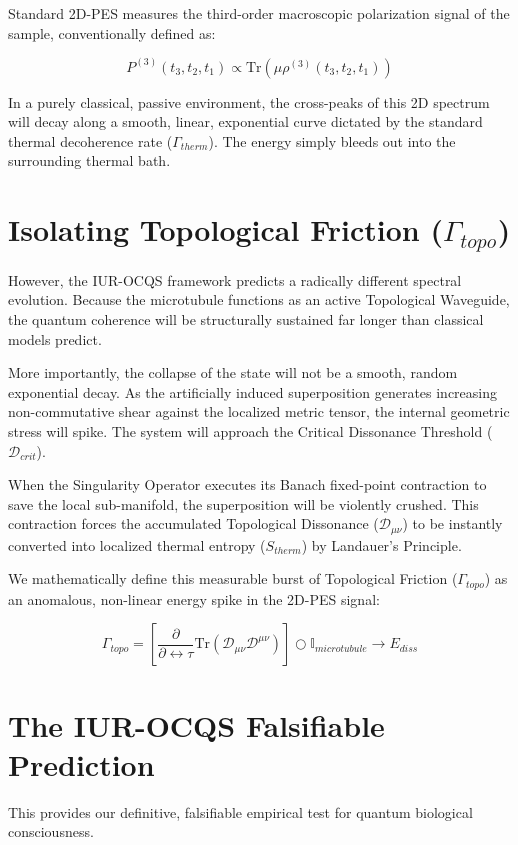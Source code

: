 \documentclass[12pt,openany]{book}
\begin{document}
Standard 2D-PES measures the third-order macroscopic polarization signal of the sample, conventionally defined as:

\begin{equation}
P^{(3)}(t_3, t_2, t_1) \propto \text{Tr} \left( \hat{\mu} \rho^{(3)}(t_3, t_2, t_1) \right)
\end{equation}

In a purely classical, passive environment, the cross-peaks of this 2D spectrum will decay along a smooth, linear, exponential curve dictated by the standard thermal decoherence rate ($\Gamma_{therm}$). The energy simply bleeds out into the surrounding thermal bath.

\section{Isolating Topological Friction ($\Gamma_{topo}$)}
However, the IUR-OCQS framework predicts a radically different spectral evolution. Because the microtubule functions as an active Topological Waveguide, the quantum coherence will be structurally sustained far longer than classical models predict. 

More importantly, the collapse of the state will not be a smooth, random exponential decay. As the artificially induced superposition generates increasing non-commutative shear against the localized metric tensor, the internal geometric stress will spike. The system will approach the Critical Dissonance Threshold ($\mathcal{D}_{crit}$). 

When the Singularity Operator executes its Banach fixed-point contraction to save the local sub-manifold, the superposition will be violently crushed. This contraction forces the accumulated Topological Dissonance ($\mathcal{D}_{\mu\nu}$) to be instantly converted into localized thermal entropy ($S_{therm}$) by Landauer's Principle. 

We mathematically define this measurable burst of Topological Friction ($\Gamma_{topo}$) as an anomalous, non-linear energy spike in the 2D-PES signal:

\begin{equation}
\Gamma_{topo} = \left[ \frac{\partial}{\partial \leftrightarrow\tau} \text{Tr}(\mathcal{D}_{\mu\nu} \mathcal{D}^{\mu\nu}) \right] \bigcirc \mathbb{I}_{microtubule} \to E_{diss}
\end{equation}

\section{The IUR-OCQS Falsifiable Prediction}
This provides our definitive, falsifiable empirical test for quantum biological consciousness. 
\end{document}
